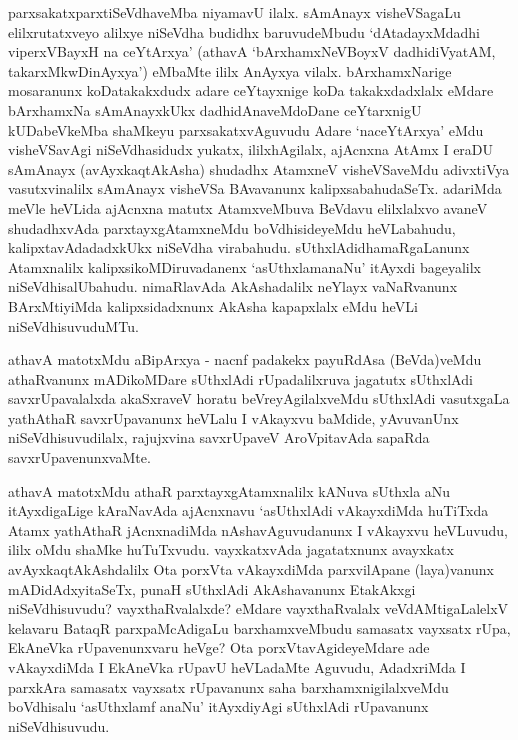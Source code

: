 \begin{artha}
parxsakatxparxtiSeVdhaveMba niyamavU ilalx. sAmAnayx visheVSagaLu	elilxrutatxveyo alilxye niSeVdha budidhx baruvudeMbudu `dAtadayxMdadhi viperxVBayxH na ceYtArxya' (athavA `bArxhamxNeVBoyxV dadhidiVyatAM, takarxMkwDinAyxya') eMbaMte ililx  AnAyxya vilalx. bArxhamxNarige mosaranunx koDatakakxdudx adare ceYtayxnige koDa takakxdadxlalx eMdare bArxhamxNa sAmAnayxkUkx dadhidAnaveMdoDane ceYtarxnigU kUDabeVkeMba shaMkeyu parxsakatxvAguvudu Adare `naceYtArxya' eMdu visheVSavAgi niSeVdhasidudx yukatx, ililxhAgilalx, ajAcnxna AtAmx I eraDU sAmAnayx (avAyxkaqtAkAsha) shudadhx AtamxneV visheVSaveMdu adivxtiVya vasutxvinalilx sAmAnayx visheVSa BAvavanunx kalipxsabahudaSeTx. adariMda meVle heVLida ajAcnxna matutx AtamxveMbuva BeVdavu elilxlalxvo avaneV shudadhxvAda parxtayxgAtamxneMdu boVdhisideyeMdu heVLabahudu, kalipxtavAdadadxkUkx niSeVdha virabahudu. sUthxlAdidhamaRgaLanunx Atamxnalilx kalipxsikoMDiruvadanenx `asUthxlamanaNu' itAyxdi bageyalilx niSeVdhisalUbahudu. nimaRlavAda AkAshadalilx neYlayx vaNaRvanunx BArxMtiyiMda kalipxsidadxnunx AkAsha kapapxlalx eMdu heVLi niSeVdhisuvuduMTu. 
\end{artha}

\begin{artha}
athavA matotxMdu aBipArxya - nacnf padakekx payuRdAsa (BeVda)veMdu athaRvanunx mADikoMDare sUthxlAdi rUpadalilxruva jagatutx sUthxlAdi savxrUpavalalxda akaSxraveV horatu beVreyAgilalxveMdu sUthxlAdi vasutxgaLa yathAthaR savxrUpavanunx heVLalu I vAkayxvu baMdide, yAvuvanUnx niSeVdhisuvudilalx, rajujxvina savxrUpaveV AroVpitavAda sapaRda savxrUpavenunxvaMte. 
\end{artha}


\begin{artha}
athavA matotxMdu athaR parxtayxgAtamxnalilx kANuva sUthxla aNu itAyxdigaLige kAraNavAda ajAcnxnavu `asUthxlAdi vAkayxdiMda huTiTxda Atamx yathAthaR jAcnxnadiMda nAshavAguvudanunx I vAkayxvu heVLuvudu, ililx oMdu shaMke huTuTxvudu. vayxkatxvAda jagatatxnunx avayxkatx avAyxkaqtAkAshdalilx Ota porxVta vAkayxdiMda parxvilApane (laya)vanunx mADidAdxyitaSeTx, punaH sUthxlAdi AkAshavanunx EtakAkxgi niSeVdhisuvudu? vayxthaRvalalxde? eMdare vayxthaRvalalx veVdAMtigaLalelxV kelavaru BataqR parxpaMcAdigaLu barxhamxveMbudu samasatx vayxsatx rUpa, EkAneVka rUpavenunxvaru heVge? Ota porxVtavAgideyeMdare ade vAkayxdiMda I EkAneVka rUpavU heVLadaMte Aguvudu, AdadxriMda I parxkAra samasatx vayxsatx rUpavanunx saha barxhamxnigilalxveMdu boVdhisalu `asUthxlamf anaNu' itAyxdiyAgi sUthxlAdi rUpavanunx niSeVdhisuvudu.
\end{artha}

